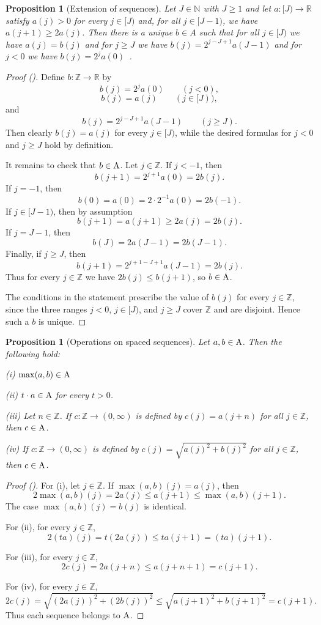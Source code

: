 \documentclass[12pt,reqno]{amsart}
\newcommand{\auto}{{({\tiny\faCar})}}
\theoremstyle{plain}
\newtheorem{proposition}[theorem]{Proposition}
\numberwithin{equation}{section}
\theoremstyle{remark}
\newcommand{\Z}{{\mathbb Z}}
\newcommand{\R}{{\mathbb R}}
\newcommand{\N}{{\mathbb N}}
\begin{document}
\begin{proposition}[Extension of sequences]\label{Extension of sequences}
Let $J\in\N$ with $J\ge1$ and let $a:[J)\to\R$ satisfy $a(j)>0$ for every $j\in[J)$ and, for all $j\in[J-1)$, we have $a(j+1)\ge 2a(j)$.
Then there is a unique $b\in A$ such that for all $j\in [J)$ we have $a(j)=b(j)$ and for $j\ge J$ we have $b(j)=2^{j-J+1} a(J-1)$ and for $j<0$ we have $b(j)=2^j a(0)$\, .
\end{proposition}
\begin{proof}[Proof \auto]
Define $b:\Z\to\R$ by
\[
b(j)=2^ja(0)\qquad(j<0),
\]
\[
b(j)=a(j)\qquad(j\in[J)),
\]
and
\[
b(j)=2^{j-J+1}a(J-1)\qquad(j\ge J).
\]
Then clearly $b(j)=a(j)$ for every $j\in[J)$, while the desired formulas for
$j<0$ and $j\ge J$ hold by definition.

It remains to check that $b\in {\rm A}$. Let $j\in\Z$. If $j<-1$, then
\[
 b(j+1)=2^{j+1}a(0)=2b(j).
\]
If $j=-1$, then
\[
 b(0)=a(0)=2\cdot 2^{-1}a(0)=2b(-1).
\]
If $j\in [J-1)$, then by assumption
\[
 b(j+1)=a(j+1)\ge 2a(j)=2b(j).
\]
If $j=J-1$, then
\[
 b(J)=2a(J-1)=2b(J-1).
\]
Finally, if $j\ge J$, then
\[
 b(j+1)=2^{j+1-J+1}a(J-1)=2b(j).
\]
Thus for every $j\in\Z$ we have $2b(j)\le b(j+1)$, so $b\in{\rm A}$.

The conditions in the statement prescribe the value of $b(j)$ for every
$j\in\Z$, since the three ranges $j<0$, $j\in[J)$, and $j\ge J$ cover
$\Z$ and are disjoint. Hence such a $b$ is unique.
\end{proof}


\begin{proposition}[Operations on spaced sequences]\label{Operations on spaced sequences}
    Let $a,b\in {\rm A}$. Then the following hold:

    (i) $\max(a,b)\in {\rm A}$

    (ii) $t\cdot a\in {\rm A}$ for every $t>0$.

    (iii) Let $n\in\mathbb{Z}$. If $c:\Z\to(0,\infty)$ is defined by $c(j)=a(j+n)$ for all $j\in\mathbb{Z}$, then $c\in {\rm A}$.

    (iv) If $c:\Z\to (0,\infty)$ is defined by $c(j)=\sqrt{a(j)^2+b(j)^2}$ for all $j\in\Z$, then $c\in {\rm A}$.
\end{proposition}
\begin{proof}[Proof \auto]
For (i), let $j\in\Z$. If $\max(a,b)(j)=a(j)$, then
\[
2\max(a,b)(j)=2a(j)\le a(j+1)\le\max(a,b)(j+1).
\]
The case $\max(a,b)(j)=b(j)$ is identical.

For (ii), for every $j\in\Z$,
\[
2(ta)(j)=t(2a(j))\le ta(j+1)=(ta)(j+1).
\]

For (iii), for every $j\in\Z$,
\[
2c(j)=2a(j+n)\le a(j+n+1)=c(j+1).
\]

For (iv), for every $j\in\Z$,
\[
2c(j)=\sqrt{(2a(j))^2+(2b(j))^2}
\le\sqrt{a(j+1)^2+b(j+1)^2}=c(j+1).
\]
Thus each sequence belongs to ${\rm A}$.
\end{proof}
\end{document}
